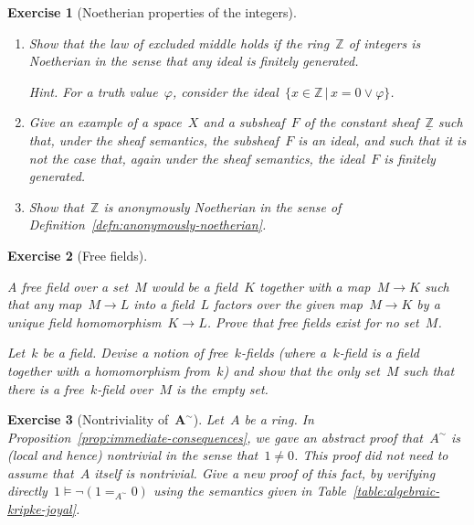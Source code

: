\documentclass{ws-rv9x6}
\newtheorem{ex}{Exercise}
\newenvironment{exercise}[1]{
  \begin{ex}[#1]
}{\end{ex}}
\newcommand{\ZZ}{\mathbb{Z}}
\renewcommand{\_}{\mathpunct{.}}
\newcommand{\?}{\,{:}\,}
\begin{document}
\begin{exercise}{Noetherian properties of the integers}%
\begin{enumerate}
\item Show that the law of excluded middle holds if the ring~$\ZZ$ of integers
is Noetherian in the sense that any ideal is finitely generated.\smallskip

{\scriptsize\emph{Hint.} For a truth value~$\varphi$, consider the ideal~$\{ x
\in \ZZ \,|\, x = 0 \vee \varphi \}$.\par}
\item Give an example of a space~$X$ and a subsheaf~$F$ of the constant
sheaf~$\underline{\ZZ}$ such that, under the sheaf semantics, the subsheaf~$F$
is an ideal, and such that it is not the case that, again under the sheaf
semantics, the ideal~$F$ is finitely generated.
\item Show that~$\ZZ$ is anonymously Noetherian in the sense of
Definition~\ref{defn:anonymously-noetherian}.
\end{enumerate}
\end{exercise}

\begin{exercise}{Free fields}
\begin{alphlist}[(b)]
\item A \emph{free field} over a set~$M$ would be
a field~$K$ together with a map~$M \to K$ such that any map~$M \to L$ into a
field~$L$ factors
over the given map~$M \to K$ by a unique field homomorphism~$K \to L$. Prove
that free fields exist for no set~$M$.
\item Let~$k$ be a field. Devise a notion of
\emph{free~$k$-fields} (where a~$k$-field is a field together with a
homomorphism from~$k$) and show that the only set~$M$ such that there is a
free~$k$-field over~$M$ is the empty set.
\end{alphlist}
\end{exercise}

\begin{exercise}{Nontriviality of~$\boldsymbol{A^\sim}$}%
Let~$A$ be a ring. In Proposition~\ref{prop:immediate-consequences}, we gave an
abstract proof that~$A^\sim$ is (local and hence) nontrivial in the sense that~$1
\neq 0$. This proof did not need to assume that~$A$ itself is nontrivial. Give a new proof of this
fact, by verifying directly~$1 \models \neg(1 =_{A^\sim} 0)$ using the
semantics given in Table~\ref{table:algebraic-kripke-joyal}.
\end{exercise}
\end{document}
